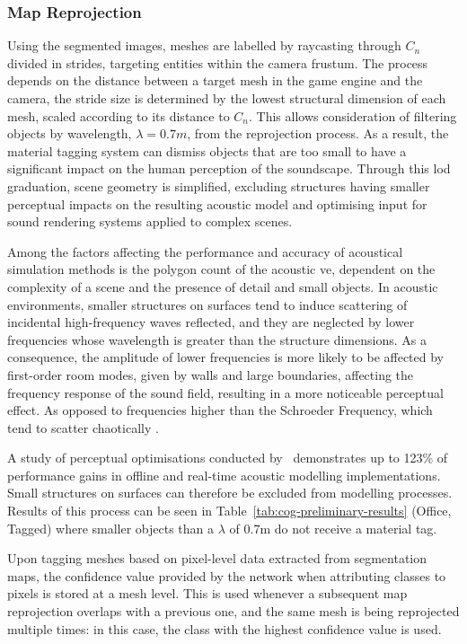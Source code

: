 \subsubsection{Map Reprojection}
Using the segmented images, meshes are labelled by raycasting through $C_n$ divided in strides, targeting entities within the camera frustum. The process depends on the distance between a target mesh in the game engine and the camera, the stride size is determined by the lowest structural dimension of each mesh, scaled according to its distance to $C_n$. This allows consideration of filtering objects by wavelength, $\lambda = 0.7m$, from the reprojection process. As a result, the material tagging system can dismiss objects that are too small to have a significant impact on the human perception of the soundscape. Through this \acrfull{lod} graduation, scene geometry is simplified, excluding structures having smaller perceptual impacts on the resulting acoustic model and optimising input for sound rendering systems applied to complex scenes.\par
Among the factors affecting the performance and accuracy of acoustical simulation methods is the polygon count of the acoustic \acrshort{ve}, dependent on the complexity of a scene and the presence of detail and small objects. In acoustic environments, smaller structures on surfaces tend to induce scattering of incidental high-frequency waves reflected, and they are neglected by lower frequencies whose wavelength is greater than the structure dimensions. As a consequence, the amplitude of lower frequencies is more likely to be affected by first-order room modes, given by walls and large boundaries, affecting the frequency response of the sound field, resulting in a more noticeable perceptual effect. As opposed to frequencies higher than the Schroeder Frequency, which tend to scatter chaotically \citep{kuttruff2016room, blauert1997spatial}.\par
A study of perceptual optimisations conducted by~\cite{pelzer2010frequency} demonstrates up to 123\% of performance gains in offline and real-time acoustic modelling implementations. Small structures on surfaces can therefore be excluded from modelling processes. Results of this process can be seen in Table~\ref{tab:cog-preliminary-results} (Office, Tagged) where smaller objects than a $\lambda$ of 0.7m do not receive a material tag.\par
Upon tagging meshes based on pixel-level data extracted from segmentation maps, the confidence value provided by the network when attributing classes to pixels is stored at a mesh level. This is used whenever a subsequent map reprojection overlaps with a previous one, and the same mesh is being reprojected multiple times: in this case, the class with the highest confidence value is used.\par

